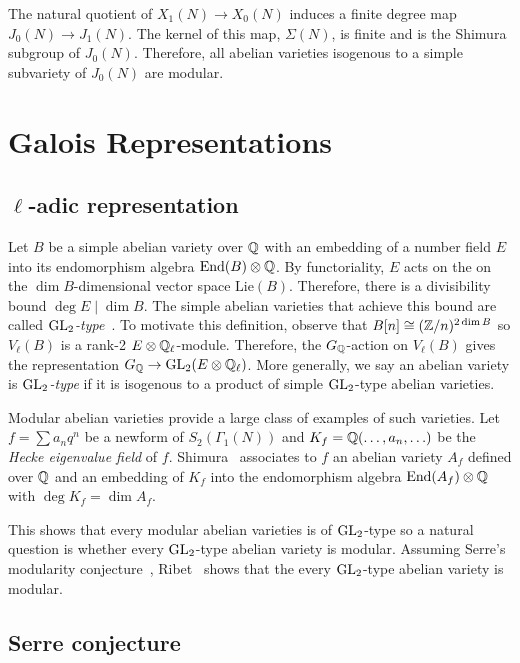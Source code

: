 \documentclass[11pt, proquest]{uwthesis}
\begin{document}
The natural quotient of $X_1(N)\to X_0(N)$ induces a finite degree map
$J_0(N)\to J_1(N)$. The kernel of this map, $\Sigma(N)$, is finite and is the
Shimura subgroup of $J_0(N)$. Therefore, all abelian varieties isogenous to a
simple subvariety of $J_0(N)$ are modular.


\section{Galois Representations} 

\subsection{$\ell$-adic representation}%
\label{sub:_ell_adic_representation}

Let $B$ be a simple abelian variety over $\mathbb{Q}$ with an embedding of a number
field $E$ into its endomorphism algebra $\operatorname{End}(B)\otimes \mathbb{Q}$. By functoriality,
$E$ acts on the on the $\dim B$-dimensional vector space $\mathrm{Lie}(B)$.
Therefore, there is a divisibility bound $\deg E\mid \dim B$. The simple
abelian varieties that achieve this bound are called
\emph{$\operatorname{GL}_2$-type}~\cite[\S 2]{ribet:abvars}. To motivate this definition,
observe that $B[n]\cong (\mathbb{Z}/n)^{2\dim B}$ so $V_\ell(B)$ is a rank-2 $E\otimes
\mathbb{Q}_\ell$-module. Therefore, the $G_{\mathbb{Q}}$-action on $V_\ell(B)$ gives the
representation $G_{\mathbb{Q}}\to \operatorname{GL}_2(E\otimes \mathbb{Q}_\ell)$. More generally, we say an
abelian variety is \emph{$\operatorname{GL}_2$-type} if it is isogenous to a product of
simple $\operatorname{GL}_2$-type abelian varieties.

Modular abelian varieties provide a large class of examples of such varieties.
Let $f=\sum a_n q^n$ be a newform of $S_2(\Gamma_1(N))$ and
$K_f=\mathbb{Q}(\ldots,a_n,\ldots)$ be the \emph{Hecke eigenvalue field} of $f$.
Shimura~\cite[Theorem 7.14]{shimura:intro} associates to $f$ an abelian variety
$A_f$ defined over $\mathbb{Q}$ and an embedding of $K_f$ into the endomorphism
algebra $\operatorname{End}(A_f)\otimes \mathbb{Q}$ with $\deg K_f = \dim A_f$. 

This shows that every modular abelian varieties is of $\operatorname{GL}_2$-type so a natural
question is whether every $\operatorname{GL}_2$-type abelian variety is modular. Assuming Serre's
modularity conjecture~\cite[3.2.4]{serre:conjectures}, Ribet~\cite[Thm.
4.4]{ribet:abvars} shows that the every $\operatorname{GL}_2$-type abelian variety is
modular.

\subsection{Serre conjecture}%
\label{sub:serre_conjecture}
\end{document}
